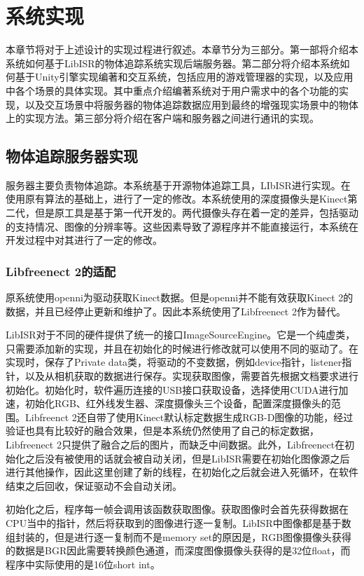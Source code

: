 \chapter{系统实现}
\label{implement}

本章节将对于上述设计的实现过程进行叙述。本章节分为三部分。第一部将介绍本系统如何基于LibISR的物体追踪系统\cite{Ren_3DV_2014, star3d_iccv_2013}实现后端服务器。第二部分将介绍本系统如何基于Unity引擎实现编著和交互系统，包括应用的游戏管理器的实现，以及应用中各个场景的具体实现。其中重点介绍编著系统对于用户需求中的各个功能的实现，以及交互场景中将服务器的物体追踪数据应用到最终的增强现实场景中的物体上的实现方法。第三部分将介绍在客户端和服务器之间进行通讯的实现。

\section{物体追踪服务器实现}
服务器主要负责物体追踪。本系统基于开源物体追踪工具，LIbISR进行实现。在使用原有算法的基础上，进行了一定的修改。本系统使用的深度摄像头是Kinect第二代，但是原工具是基于第一代开发的。两代摄像头存在着一定的差异，包括驱动的支持情况、图像的分辨率等。这些因素导致了源程序并不能直接运行，本系统在开发过程中对其进行了一定的修改。

\subsection{Libfreenect 2的适配}

原系统使用openni为驱动获取Kinect数据。但是openni并不能有效获取Kinect 2的数据，并且已经停止更新和维护了。因此本系统使用了Libfreenect 2作为替代。

LibISR对于不同的硬件提供了统一的接口ImageSourceEngine。它是一个纯虚类，只需要添加新的实现，并且在初始化的时候进行修改就可以使用不同的驱动了。在实现时，保存了Private data类，将驱动的不变数据，例如device指针，listener指针，以及从相机获取的数据进行保存。实现获取图像，需要首先根据文档要求进行初始化。初始化时，软件遍历连接的USB接口获取设备，选择使用CUDA进行加速，初始化RGB、红外线发生器、深度摄像头三个设备，配置深度摄像头的范围。Libfreenct 2还自带了使用Kinect默认标定数据生成RGB-D图像的功能，经过验证也具有比较好的融合效果，但是本系统仍然使用了自己的标定数据，Libfreenect 2只提供了融合之后的图片，而缺乏中间数据。此外，Libfreenect在初始化之后没有被使用的话就会被自动关闭，但是LibISR需要在初始化图像源之后进行其他操作，因此这里创建了新的线程，在初始化之后就会进入死循环，在软件结束之后回收，保证驱动不会自动关闭。

初始化之后，程序每一帧会调用该函数获取图像。获取图像时会首先获得数据在CPU当中的指针，然后将获取到的图像进行逐一复制。LibISR中图像都是基于数组封装的，但是进行逐一复制而不是memory set的原因是，RGB图像摄像头获得的数据是BGR因此需要转换颜色通道，而深度图像摄像头获得的是32位float，而程序中实际使用的是16位short int。

